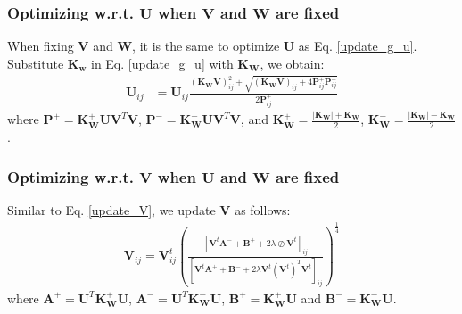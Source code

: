 \documentclass[10pt,journal,compsoc]{IEEEtran}
\begin{document}
\subsubsection{Optimizing w.r.t. $\mathbf{U}$ when $\mathbf{V}$ and $\mathbf{W}$ are fixed}
When fixing $\mathbf{V}$ and $\mathbf{W}$, it is the same to optimize  $\mathbf{U}$ as Eq. \eqref{update_g_u}. Substitute $\mathbf{K_w}$ in Eq. \eqref{update_g_u} with $\mathbf{K_W}$, we obtain:
\begin{align}\label{update_l_u}
\mathbf{U}_{ij} & = \mathbf{U}_{ij} \frac{(\mathbf{K}_{\mathbf{W}} \mathbf{V})_{ij}^2 + \sqrt{(\mathbf{K}_{\mathbf{W}} \mathbf{V})_{ij} + 4 \mathbf{P}_{ij}^{+} \mathbf{P}_{ij}^{-} }}{2 \mathbf{P}_{ij}^{+}}
\end{align}
where $\mathbf{P}^{+} = \mathbf{K}_{\mathbf{W}}^{+} \mathbf{U} \mathbf{V}^{T} \mathbf{V}$, $\mathbf{P}^{-} = \mathbf{K}_{\mathbf{W}}^{-} \mathbf{U} \mathbf{V}^{T} \mathbf{V}$, and $\mathbf{K}_{\mathbf{W}}^{+} = \frac{|\mathbf{K}_{\mathbf{W}}| + \mathbf{K}_{\mathbf{W}}}{2}$, $\mathbf{K}_{\mathbf{W}}^{-} = \frac{|\mathbf{K}_{\mathbf{W}}| - \mathbf{K}_{\mathbf{W}}}{2}$.

\subsubsection{Optimizing w.r.t. $\mathbf{V}$ when $\mathbf{U}$ and $\mathbf{W}$ are fixed}
Similar to Eq. \eqref{update_V}, we update $\mathbf{V}$ as follows:
\begin{align}\label{update_l_V}
\mathbf{V}_{ij} = \mathbf{V}_{ij}^{t} \left( \frac{[ \mathbf{V}^{t} \mathbf{A}^{-} +  \mathbf{B}^{+} + 2 \lambda \oslash \mathbf{V}^{t}  ]_{ij} }{[ \mathbf{V}^{t} \mathbf{A}^{+} + \mathbf{B}^{-} + 2 \lambda \mathbf{V}^{t}  (\mathbf{V}^{t})^T  \mathbf{V}^{t} ]_{ij} } \right)^{\frac{1}{4}}
\end{align}
where $\mathbf{A}^{+} = \mathbf{U}^T \mathbf{K}_{\mathbf{W}}^{+} \mathbf{U}$, $\mathbf{A}^{-} = \mathbf{U}^T \mathbf{K}_{\mathbf{W}}^{-} \mathbf{U}$, $\mathbf{B}^{+} = \mathbf{K}_{\mathbf{W}}^{+} \mathbf{U}$ and $\mathbf{B}^{-} = \mathbf{K}_{\mathbf{W}}^{-} \mathbf{U}$.
\end{document}
